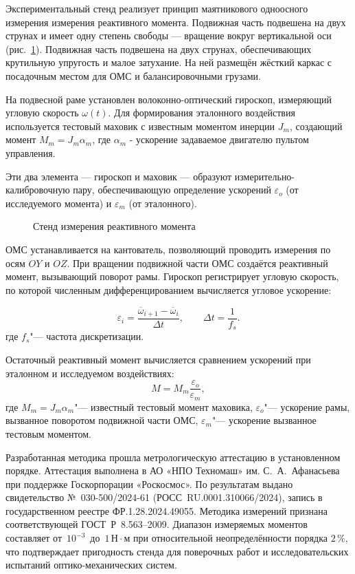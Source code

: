 Экспериментальный стенд реализует принцип маятникового одноосного измерения измерения реактивного момента.
Подвижная часть подвешена на двух струнах и имеет одну степень свободы — вращение вокруг вертикальной оси (рис.~\cref{fig:yoiom}). Подвижная часть подвешена на двух струнах, обеспечивающих крутильную упругость и малое затухание. На ней размещён жёсткий каркас с посадочным местом для ОМС и балансировочными грузами. 

На подвесной раме установлен волоконно-оптический гироскоп, измеряющий угловую скорость $\omega(t)$. Для формирования эталонного воздействия используется тестовый маховик с известным моментом инерции $J_m$, создающий момент $M_m=J_m\alpha_m$, где $\alpha_m$ - ускорение задаваемое двигателю пультом управления.

Эти два элемента — гироскоп и маховик — образуют измерительно-калибровочную пару, обеспечивающую определение ускорений $\varepsilon_o$ (от исследуемого момента) и $\varepsilon_m$ (от эталонного).

\begin{figure}[!h] 
	\caption{Стенд измерения реактивного момента}
	\label{fig:yoiom} 
\end{figure}

ОМС устанавливается на кантователь, позволяющий проводить измерения по осям $OY$ и $OZ$.
При вращении подвижной части ОМС создаётся реактивный момент, вызывающий поворот рамы. Гироскоп регистрирует угловую скорость, по которой численным дифференцированием вычисляется угловое ускорение:

\begin{equation*}
	\label{eq:mean_acc}
	\varepsilon_{i}
	= \frac{\overline{\omega}_{i+1}-\overline{\omega}_{i}}{\Delta t},
	\qquad
	\Delta t = \frac{1}{f_s}.
\end{equation*}
где \(f_s\)"--- частота дискретизации.

Остаточный реактивный момент вычисляется сравнением ускорений при эталонном и исследуемом воздействиях:
\begin{equation*}
	M = M_m\frac{\varepsilon_o}{\varepsilon_m},
\end{equation*}
где \(M_m = J_m\alpha_m\)"--- известный тестовый момент маховика, \(\varepsilon_o\)"--- ускорение рамы, вызванное поворотом подвижной части ОМС, \(\varepsilon_m\)"--- ускорение вызванное тестовым моментом.


Разработанная методика прошла метрологическую аттестацию
в установленном порядке. Аттестация выполнена в АО «НПО Техномаш»
им. С.~А.~Афанасьева при поддержке Госкорпорации «Роскосмос».
По результатам выдано свидетельство №~030-500/2024-61
(РОСС~RU.0001.310066/2024), запись в государственном реестре
ФР.1.28.2024.49055. Методика измерений признана соответствующей
ГОСТ~Р~8.563–2009. Диапазон измеряемых моментов составляет
от~$10^{-3}$~до~$1\,\text{Н}\cdot\text{м}$ при относительной
неопределённости порядка $2\,\%$, что подтверждает пригодность стенда
для поверочных работ и исследовательских испытаний оптико-механических систем.

